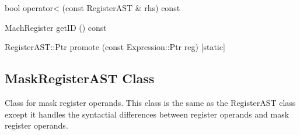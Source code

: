 \begin{apient}
  bool operator< (const RegisterAST & rhs) const
\end{apient}

\begin{apient}
  MachRegister getID () const
\end{apient}

\begin{apient}
  RegisterAST::Ptr promote (const Expression::Ptr reg) [static]
\end{apient}


\subsection{MaskRegisterAST Class}
\label{sec:MaskRegisterAST}

Class for mask register operands. This class is the same as the RegisterAST
class except it handles the syntactial differences between register operands
and mask register operands.
